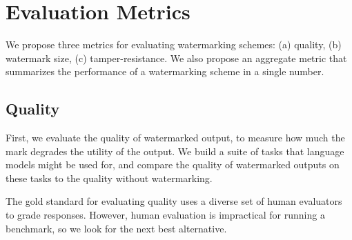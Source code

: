 \section{Evaluation Metrics}
\label{sec:metrics}

We propose three metrics for evaluating watermarking
schemes: (a) quality, (b) watermark size, (c) tamper-resistance.
We also propose an aggregate metric that summarizes the
performance of a watermarking scheme in a single number.

%
%
%
%

\subsection{Quality}

First, we evaluate the quality of watermarked output,
to measure how much the mark degrades the utility of the output.
We build a suite of tasks that language models might be used
for, and compare the quality of watermarked outputs on these
tasks to the quality without watermarking.

The gold standard for evaluating quality uses
a diverse set of human evaluators to grade responses.
%
%
%
%
However, human evaluation is impractical for running a benchmark, 
so we look for the next best alternative.

